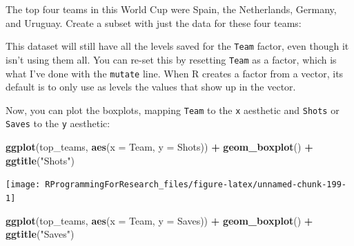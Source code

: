 \documentclass[]{book}
\makeatletter
\newenvironment{Shaded}{\begin{snugshade}}{\end{snugshade}}
\newcommand{\KeywordTok}[1]{\textcolor[rgb]{0.13,0.29,0.53}{\textbf{#1}}}
\newcommand{\DataTypeTok}[1]{\textcolor[rgb]{0.13,0.29,0.53}{#1}}
\newcommand{\StringTok}[1]{\textcolor[rgb]{0.31,0.60,0.02}{#1}}
\newcommand{\OperatorTok}[1]{\textcolor[rgb]{0.81,0.36,0.00}{\textbf{#1}}}
\newcommand{\NormalTok}[1]{#1}
\newenvironment{kframe}{%
\medskip{}
\setlength{\fboxsep}{.8em}
 \def\at@end@of@kframe{}%
 \ifinner\ifhmode%
  \def\at@end@of@kframe{\end{minipage}}%
  \begin{minipage}{\columnwidth}%
 \fi\fi%
 \def\FrameCommand##1{\hskip\@totalleftmargin \hskip-\fboxsep
 \colorbox{shadecolor}{##1}\hskip-\fboxsep
     \hskip-\linewidth \hskip-\@totalleftmargin \hskip\columnwidth}%
 \MakeFramed {\advance\hsize-\width
   \@totalleftmargin\z@ \linewidth\hsize
   \@setminipage}}%
 {\par\unskip\endMakeFramed%
 \at@end@of@kframe}
\renewenvironment{Shaded}{\begin{kframe}}{\end{kframe}}
\theoremstyle{definition}
\theoremstyle{definition}
\theoremstyle{definition}
\theoremstyle{remark}
\makeatother
\begin{document}
The top four teams in this World Cup were Spain, the Netherlands,
Germany, and Uruguay. Create a subset with just the data for these four
teams:

\begin{Shaded}
\end{Shaded}

This dataset will still have all the levels saved for the \texttt{Team}
factor, even though it isn't using them all. You can re-set this by
resetting \texttt{Team} as a factor, which is what I've done with the
\texttt{mutate} line. When R creates a factor from a vector, its default
is to only use as levels the values that show up in the vector.

Now, you can plot the boxplots, mapping \texttt{Team} to the \texttt{x}
aesthetic and \texttt{Shots} or \texttt{Saves} to the \texttt{y}
aesthetic:

\begin{Shaded}
\begin{Highlighting}[]
\KeywordTok{ggplot}\NormalTok{(top_teams, }\KeywordTok{aes}\NormalTok{(}\DataTypeTok{x =}\NormalTok{ Team, }\DataTypeTok{y =}\NormalTok{ Shots)) }\OperatorTok{+}\StringTok{ }
\StringTok{  }\KeywordTok{geom_boxplot}\NormalTok{() }\OperatorTok{+}\StringTok{ }
\StringTok{  }\KeywordTok{ggtitle}\NormalTok{(}\StringTok{"Shots"}\NormalTok{)}
\end{Highlighting}
\end{Shaded}

\begin{center}\texttt{[image: RProgrammingForResearch\_files/figure-latex/unnamed-chunk-199-1]} \end{center}

\begin{Shaded}
\begin{Highlighting}[]
\KeywordTok{ggplot}\NormalTok{(top_teams, }\KeywordTok{aes}\NormalTok{(}\DataTypeTok{x =}\NormalTok{ Team, }\DataTypeTok{y =}\NormalTok{ Saves)) }\OperatorTok{+}\StringTok{ }
\StringTok{  }\KeywordTok{geom_boxplot}\NormalTok{() }\OperatorTok{+}\StringTok{ }
\StringTok{  }\KeywordTok{ggtitle}\NormalTok{(}\StringTok{"Saves"}\NormalTok{)}
\end{Highlighting}
\end{Shaded}
\end{document}
